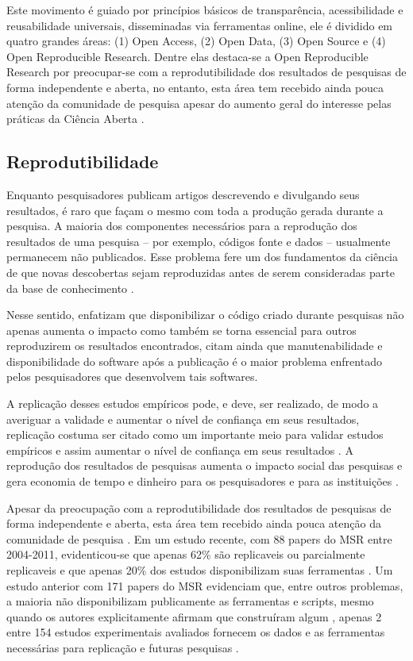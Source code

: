 Este movimento é guiado por princípios básicos de transparência, acessibilidade
e reusabilidade universais, disseminadas via ferramentas online, ele é dividido
em quatro grandes áreas: (1) Open Access, (2) Open Data, (3) Open Source e (4)
Open Reproducible Research. Dentre elas destaca-se a Open Reproducible Research
por preocupar-se com a reprodutibilidade dos resultados de pesquisas de forma
independente \cite{stodden2009} e aberta, no entanto, esta área tem recebido
ainda pouca atenção da comunidade de pesquisa \cite{Nancy2015}
\cite{Grand2010Open} apesar do aumento geral do interesse pelas práticas da
Ciência Aberta \cite{Grand2010}.

\subsection{Reprodutibilidade}

Enquanto pesquisadores publicam artigos descrevendo e divulgando seus
resultados, é raro que façam o mesmo com toda a produção gerada durante a
pesquisa. A maioria dos componentes necessários para a reprodução dos
resultados de uma pesquisa -- por exemplo, códigos fonte e dados -- usualmente
permanecem não publicados. Esse problema fere um dos fundamentos
da ciência de que novas descobertas sejam reproduzidas antes de serem
consideradas parte da base de conhecimento \cite{stodden2009enabling}.

Nesse sentido,  enfatizam que disponibilizar o código
criado durante pesquisas não apenas aumenta o impacto como também se torna
essencial para outros reproduzirem os resultados encontrados, citam ainda que
manutenabilidade e disponibilidade do software após a publicação é o maior
problema enfrentado pelos pesquisadores que desenvolvem tais softwares.

A replicação desses estudos empíricos pode, e deve, ser realizado, de modo a
averiguar a validade e aumentar o nível de confiança em seus resultados,
replicação costuma ser citado como um importante meio para validar estudos
empíricos e assim aumentar o nível de confiança em seus resultados
\cite{almqvist_replication_2006}. A reprodução dos resultados de pesquisas aumenta o impacto
social das pesquisas e gera economia de tempo e dinheiro para os pesquisadores
e para as instituições \cite{nesta2010open}.

Apesar da preocupação com a reprodutibilidade dos resultados de pesquisas de
forma independente \cite{stodden2009enabling} e aberta, esta área tem recebido ainda
pouca atenção da comunidade de pesquisa \cite{pontika_fostering_2015,grand_open_2010}. Em um
estudo recente, com 88 papers do MSR entre 2004-2011, evidenticou-se que apenas
62\% são replicaveis ou parcialmente replicaveis e que apenas 20\% dos estudos
disponibilizam suas ferramentas \cite{amann2015software}. Um estudo anterior
com 171 papers do MSR evidenciam que, entre outros problemas, a maioria não
disponibilizam publicamente as ferramentas e scripts, mesmo quando os autores
explicitamente afirmam que construíram algum \cite{robles2010replicating},
apenas 2 entre 154 estudos experimentais avaliados fornecem os dados e as
ferramentas necessárias para replicação e futuras pesquisas
\cite{barr_shoulders_2010}.

